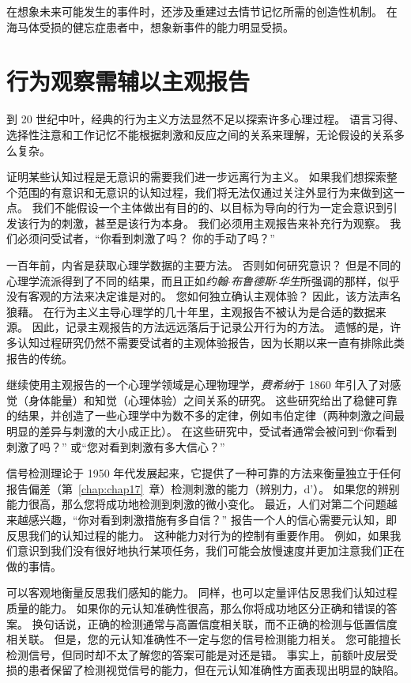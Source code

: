 在想象未来可能发生的事件时，还涉及重建过去情节记忆所需的创造性机制。
在海马体受损的健忘症患者中，想象新事件的能力明显受损。



\section{行为观察需辅以主观报告}

到 20 世纪中叶，经典的行为主义方法显然不足以探索许多心理过程。
语言习得、选择性注意和工作记忆不能根据刺激和反应之间的关系来理解，无论假设的关系多么复杂。


证明某些认知过程是无意识的需要我们进一步远离行为主义。
如果我们想探索整个范围的有意识和无意识的认知过程，我们将无法仅通过关注外显行为来做到这一点。
我们不能假设一个主体做出有目的的、以目标为导向的行为一定会意识到引发该行为的刺激，甚至是该行为本身。
我们必须用主观报告来补充行为观察。
我们必须问受试者，“你看到刺激了吗？
你的手动了吗？”


一百年前，内省是获取心理学数据的主要方法。
否则如何研究意识？
但是不同的心理学流派得到了不同的结果，而且正如\textit{约翰$\cdot$布鲁德斯$\cdot$华生}所强调的那样，似乎没有客观的方法来决定谁是对的。
您如何独立确认主观体验？
因此，该方法声名狼藉。 在行为主义主导心理学的几十年里，主观报告不被认为是合适的数据来源。
因此，记录主观报告的方法远远落后于记录公开行为的方法。
遗憾的是，许多认知过程研究仍然不需要受试者的主观体验报告，因为长期以来一直有排除此类报告的传统。


继续使用主观报告的一个心理学领域是心理物理学，\textit{费希纳}于 1860 年引入了对感觉（身体能量）和知觉（心理体验）之间关系的研究。
这些研究给出了稳健可靠的结果，并创造了一些心理学中为数不多的定律，例如韦伯定律（两种刺激之间最明显的差异与刺激的大小成正比）。
在这些研究中，受试者通常会被问到“你看到刺激了吗？” 或“您对看到刺激有多大信心？”


信号检测理论于 1950 年代发展起来，它提供了一种可靠的方法来衡量独立于任何报告偏差（第~\ref{chap:chap17}~章）检测刺激的能力（辨别力，d'）。
如果您的辨别能力很高，那么您将成功地检测到刺激的微小变化。
最近，人们对第二个问题越来越感兴趣，“你对看到刺激措施有多自信？” 
报告一个人的信心需要元认知，即反思我们的认知过程的能力。
这种能力对行为的控制有重要作用。
例如，如果我们意识到我们没有很好地执行某项任务，我们可能会放慢速度并更加注意我们正在做的事情。


可以客观地衡量反思我们感知的能力。
同样，也可以定量评估反思我们认知过程质量的能力。
如果你的元认知准确性很高，那么你将成功地区分正确和错误的答案。
换句话说，正确的检测通常与高置信度相关联，而不正确的检测与低置信度相关联。
但是，您的元认知准确性不一定与您的信号检测能力相关。
您可能擅长检测信号，但同时却不太了解您的答案可能是对还是错。
事实上，前额叶皮层受损的患者保留了检测视觉信号的能力，但在元认知准确性方面表现出明显的缺陷。


